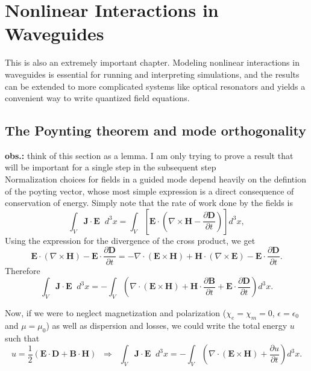 \chapter{Nonlinear Interactions in Waveguides}

This is also an extremely important chapter. Modeling nonlinear interactions in waveguides is essential for running and interpreting simulations, and the results can be extended to more complicated systems like optical resonators and yields a convenient way to write quantized field equations.

\section{The Poynting theorem and mode orthogonality}

\noindent \textbf{obs.:} think of this section as a lemma. I am only trying to prove a result that will be important for a single step in the subsequent step\\

Normalization choices for fields in a guided mode depend heavily on the defintion of the poyting vector, whose most simple expression is a direct consequence of conservation of energy. Simply note that the  rate of work done by the fields is
%
\begin{equation}
\int_V \textbf{J}\cdot\textbf{E}\;\;d^3x=\int_V\left[\textbf{E}\cdot\left(\nabla\times\textbf{H}-\frac{\partial\textbf{D}}{\partial t}\right)\right]d^3x,
\end{equation}
%
Using the expression for the divergence of the cross product, we get
%
\begin{equation}
\textbf{E}\cdot(\nabla\times\textbf{H})-\textbf{E}\cdot\frac{\partial\textbf{D}}{\partial t}=-\nabla\cdot(\textbf{E}\times\textbf{H})+\textbf{H}\cdot(\nabla\times\textbf{E})-\textbf{E}\cdot\frac{\partial\textbf{D}}{\partial t}.
\end{equation}
%
Therefore
\begin{equation}
\int_V \textbf{J}\cdot\textbf{E}\;\;d^3x=-\int_V\left(\nabla\cdot(\textbf{E}\times\textbf{H})+\textbf{H}\cdot\frac{\partial\textbf{B}}{\partial t}+\textbf{E}\cdot\frac{\partial\textbf{D}}{\partial t}\right)d^3x.
\end{equation}

Now, if we were to neglect magnetization and polarization ($\chi_e=\chi_m=0$, $\epsilon=\epsilon_0$ and $\mu=\mu_0$) as well as dispersion and losses, we could write the total energy $u$ such that
\begin{equation}
u=\frac{1}{2}\left(\textbf{E}\cdot\textbf{D}+\textbf{B}\cdot\textbf{H}\right)\;\;\Rightarrow\;\;\int_V \textbf{J}\cdot\textbf{E}\;\;d^3x=-\int_V\left(\nabla\cdot(\textbf{E}\times\textbf{H})+\frac{\partial u}{\partial t}\right)d^3x.
\end{equation}

